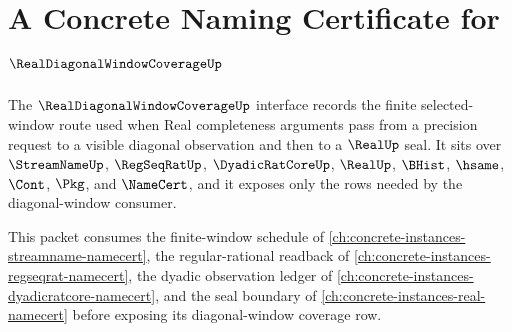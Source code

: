 \chapter{A Concrete Naming Certificate for $\RealDiagonalWindowCoverageUp$}
\label{ch:concrete-instances-realdiagonalwindowcoverage-namecert}

The $\RealDiagonalWindowCoverageUp$ interface records the finite selected-window route used when Real completeness arguments pass from a precision request to a visible diagonal observation and then to a $\RealUp$ seal. It sits over $\StreamNameUp$, $\RegSeqRatUp$, $\DyadicRatCoreUp$, $\RealUp$, $\BHist$, $\hsame$, $\Cont$, $\Pkg$, and $\NameCert$, and it exposes only the rows needed by the diagonal-window consumer.

This packet consumes the finite-window schedule of \autoref{ch:concrete-instances-streamname-namecert}, the regular-rational readback of \autoref{ch:concrete-instances-regseqrat-namecert}, the dyadic observation ledger of \autoref{ch:concrete-instances-dyadicratcore-namecert}, and the seal boundary of \autoref{ch:concrete-instances-real-namecert} before exposing its diagonal-window coverage row.

